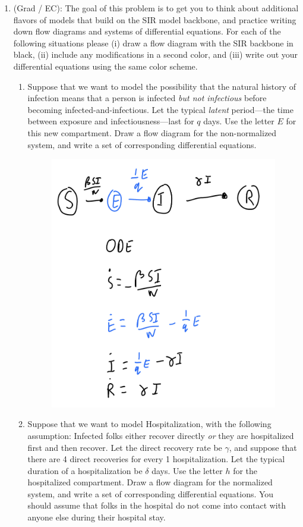 \documentclass[11pt]{article}
\begin{document}
\begin{enumerate}
\clearpage
\item (Grad / EC): The goal of this problem is to get you to think about additional flavors of models that build on the SIR model backbone, and practice writing down flow diagrams and systems of differential equations. For each of the following situations please (i) draw a flow diagram with the SIR backbone in black, (ii) include any modifications in a second color, and (iii) write out your differential equations using the same color scheme. 
\begin{enumerate}
	\item Suppose that we want to model the possibility that the natural history of infection means that a person is infected {\it but not infectious} before becoming infected-and-infectious. Let the typical {\it latent} period---the time between exposure and infectiousness---last for $q$ days. Use the letter $E$ for this new compartment. Draw a flow diagram for the non-normalized system, and write a set of corresponding differential equations. 
	\par
	\begin{figure}[H]
		\centering
		\includegraphics[width=0.5\linewidth]{figures/3a.jpeg}
		\label{fig:3a}
	\end{figure}
	\item Suppose that we want to model Hospitalization, with the following assumption: Infected folks either recover directly {\it or} they are hospitalized first and then recover. Let the direct recovery rate be $\gamma$, and suppose that there are 4 direct recoveries for every 1 hospitalization. Let the typical duration of a hospitalization be $\delta$ days. Use the letter $h$ for the hospitalized compartment. Draw a flow diagram for the normalized system, and write a set of corresponding differential equations. You should assume that folks in the hospital do not come into contact with anyone else during their hospital stay.

\end{enumerate}
\end{enumerate}
\end{document}
